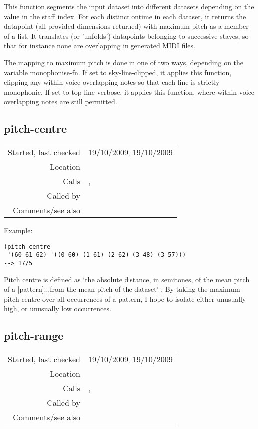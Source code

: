 \noindent This function segments the input dataset
into different datasets depending on the value in the
staff index. For each distinct ontime in each dataset,
it returns the datapoint (all provided dimensions
returned) with maximum pitch as a member of a list. It
translates (or 'unfolds') datapoints belonging to
successive staves, so that for instance none are
overlapping in generated MIDI files.

The mapping to maximum pitch is done in one of two
ways, depending on the variable monophonise-fn. If set
to sky-line-clipped, it applies this function,
clipping any within-voice overlapping notes so that
each line is strictly monophonic. If set to
top-line-verbose, it applies this function, where
within-voice overlapping notes are still permitted.


\subsection*{pitch-centre}\label{fun:pitch-centre}

\vspace{0.3cm}
\begin{tabular}{r|p{8cm}}
Started, last checked & 19/10/2009, 19/10/2009 \\
Location & \nameref{sec:musical-properties} \\
Calls & \nameref{fun:mean}, \nameref{fun:nth-list-of-lists} \\
Called by & \\
Comments/see also &
\end{tabular}

\vspace{0.5cm}
\noindent Example:
\begin{verbatim}
(pitch-centre
 '(60 61 62) '((0 60) (1 61) (2 62) (3 48) (3 57)))
--> 17/5
\end{verbatim}

\noindent Pitch centre is defined as `the absolute
distance, in semitones, of the mean pitch of a
[pattern]$\ldots$from the mean pitch of the dataset'
\citep[p.~78]{pearce2007}. By taking the maximum pitch
centre over all occurrences of a pattern, I hope to
isolate either unusually high, or unusually low
occurrences.


\subsection*{pitch-range}\label{fun:pitch-range}

\vspace{0.3cm}
\begin{tabular}{r|p{8cm}}
Started, last checked & 19/10/2009, 19/10/2009 \\
Location & \nameref{sec:musical-properties} \\
Calls & \nameref{fun:nth-list-of-lists}, \nameref{fun:range} \\
Called by & \\
Comments/see also &
\end{tabular}

